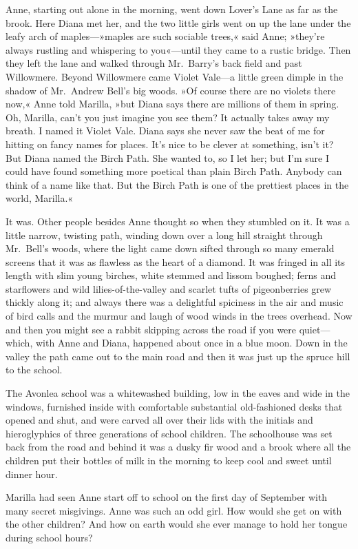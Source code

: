 Anne, starting out alone in the morning, went down Lover's Lane as far as the brook. Here Diana met her, and the two little girls went on up the lane under the leafy arch of maples—»maples are such sociable trees,« said Anne; »they're always rustling and whispering to you«—until they came to a rustic bridge. Then they left the lane and walked through Mr.~Barry's back field and past Willowmere. Beyond Willowmere came Violet Vale—a little green dimple in the shadow of Mr.~Andrew Bell's big woods. »Of course there are no violets there now,« Anne told Marilla, »but Diana says there are millions of them in spring. Oh, Marilla, can't you just imagine you see them? It actually takes away my breath. I named it Violet Vale. Diana says she never saw the beat of me for hitting on fancy names for places. It's nice to be clever at something, isn't it? But Diana named the Birch Path. She wanted to, so I let her; but I'm sure I could have found something more poetical than plain Birch Path. Anybody can think of a name like that. But the Birch Path is one of the prettiest places in the world, Marilla.«

It was. Other people besides Anne thought so when they stumbled on it. It was a little narrow, twisting path, winding down over a long hill straight through Mr.~Bell's woods, where the light came down sifted through so many emerald screens that it was as flawless as the heart of a diamond. It was fringed in all its length with slim young birches, white stemmed and lissom boughed; ferns and starflowers and wild lilies-of-the-valley and scarlet tufts of pigeonberries grew thickly along it; and always there was a delightful spiciness in the air and music of bird calls and the murmur and laugh of wood winds in the trees overhead. Now and then you might see a rabbit skipping across the road if you were quiet—which, with Anne and Diana, happened about once in a blue moon. Down in the valley the path came out to the main road and then it was just up the spruce hill to the school.

The Avonlea school was a whitewashed building, low in the eaves and wide in the windows, furnished inside with comfortable substantial old-fashioned desks that opened and shut, and were carved all over their lids with the initials and hieroglyphics of three generations of school children. The schoolhouse was set back from the road and behind it was a dusky fir wood and a brook where all the children put their bottles of milk in the morning to keep cool and sweet until dinner hour.

Marilla had seen Anne start off to school on the first day of September with many secret misgivings. Anne was such an odd girl. How would she get on with the other children? And how on earth would she ever manage to hold her tongue during school hours?

